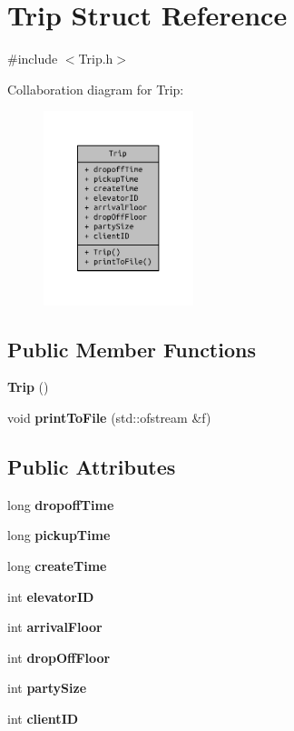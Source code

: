 \section{Trip Struct Reference}
\label{struct_trip}


{\ttfamily \#include $<$Trip.\+h$>$}



Collaboration diagram for Trip\+:\nopagebreak
\begin{figure}[H]
\begin{center}
\leavevmode
\includegraphics[width=124pt]{struct_trip__coll__graph}
\end{center}
\end{figure}
\subsection*{Public Member Functions}
\begin{DoxyCompactItemize}
\item 
{\bf Trip} ()
\item 
void {\bf print\+To\+File} (std\+::ofstream \&f)
\end{DoxyCompactItemize}
\subsection*{Public Attributes}
\begin{DoxyCompactItemize}
\item 
long {\bf dropoff\+Time}
\item 
long {\bf pickup\+Time}
\item 
long {\bf create\+Time}
\item 
int {\bf elevator\+I\+D}
\item 
int {\bf arrival\+Floor}
\item 
int {\bf drop\+Off\+Floor}
\item 
int {\bf party\+Size}
\item 
int {\bf client\+I\+D}
\end{DoxyCompactItemize}


